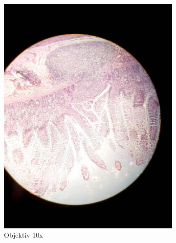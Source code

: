 \begin{figure}[h!]
\begin{subfigure}[b]{0.3\textwidth}
		\includegraphics[width=1\textwidth]{../images/02_mammal_illeum.jpg}
		\caption{Objektiv 10x}
	\end{subfigure}
	\begin{subfigure}[b]{0.3\textwidth}

\end{subfigure}
\end{figure}
